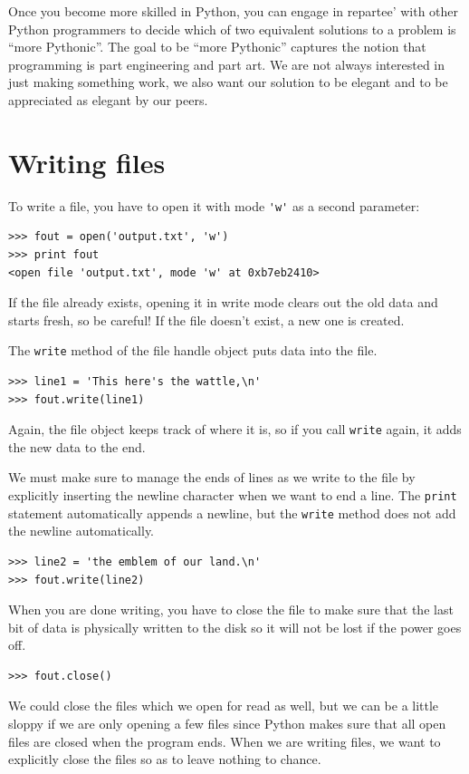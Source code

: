 \documentclass[10pt]{book}
\begin{document}
Once you become more skilled in Python, you can engage
in repartee' with other Python programmers to decide
which of two equivalent solutions to a problem is 
``more Pythonic''.  The goal to be ``more Pythonic'' 
captures the notion that programming is part engineering
and part art.  We are not always interested
in just making something work, we also want
our solution to be elegant and to be appreciated as 
elegant by our peers.


\section{Writing files}


To write a file, you have to open it with mode
\verb"'w'" as a second parameter:

\beforeverb
\begin{verbatim}
>>> fout = open('output.txt', 'w')
>>> print fout
<open file 'output.txt', mode 'w' at 0xb7eb2410>
\end{verbatim}
\afterverb
%
If the file already exists, opening it in write mode clears out
the old data and starts fresh, so be careful!
If the file doesn't exist, a new one is created.

The {\tt write} method of the file handle object 
puts data into the file.

\beforeverb
\begin{verbatim}
>>> line1 = 'This here's the wattle,\n'
>>> fout.write(line1)
\end{verbatim}
\afterverb
%
Again, the file object keeps track of where it is, so if
you call {\tt write} again, it adds the new data to the end.

We must make sure to manage the ends of lines as we write
to the file by explicitly inserting the newline character
when we want to end a line.  The {\tt print} statement 
automatically appends a newline, but the {\tt write} 
method does not add the newline automatically.

\beforeverb
\begin{verbatim}
>>> line2 = 'the emblem of our land.\n'
>>> fout.write(line2)
\end{verbatim}
\afterverb
%
When you are done writing, you have to close the file
to make sure that the last bit of data is physically written
to the disk so it will not be lost if the power goes off.

\beforeverb
\begin{verbatim}
>>> fout.close()
\end{verbatim}
\afterverb
%
We could close the files which we open for read as well, 
but we can be a little sloppy if we are only opening a few
files since Python makes sure that all open files are 
closed when the program ends.  When we are writing files, 
we want to explicitly close the files so as to leave nothing
to chance.
\end{document}
